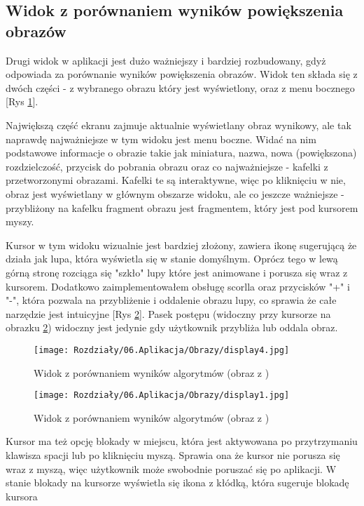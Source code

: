 \subsection*{Widok z porównaniem wyników powiększenia obrazów}

Drugi widok w aplikacji jest dużo ważniejszy i bardziej rozbudowany, gdyż odpowiada za porównanie wyników powiększenia obrazów. Widok ten składa się z dwóch części - z wybranego obrazu który jest wyświetlony, oraz z menu bocznego [Rys \ref{fig:image93}].

Największą część ekranu zajmuje aktualnie wyświetlany obraz wynikowy, ale tak naprawdę najważniejsze w tym widoku jest menu boczne. Widać na nim podstawowe informacje o obrazie takie jak miniatura, nazwa, nowa (powiększona) rozdzielczość, przycisk do pobrania obrazu oraz co najważniejsze - kafelki z przetworzonymi obrazami. Kafelki te są interaktywne, więc po kliknięciu w nie, obraz jest wyświetlany w głównym obszarze widoku, ale co jeszcze ważniejsze - przybliżony na kafelku fragment obrazu jest fragmentem, który jest pod kursorem myszy. 

Kursor w tym widoku wizualnie jest bardziej złożony, zawiera ikonę sugerującą że działa jak lupa, która wyświetla się w stanie domyślnym. Oprócz tego w lewą górną stronę rozciąga się "szkło" lupy które jest animowane i porusza się wraz z kursorem. 
Dodatkowo zaimplementowałem obsługę scorlla oraz przycisków "+" i "-", która pozwala na przybliżenie i oddalenie obrazu lupy, co sprawia że całe narzędzie jest intuicyjne [Rys \ref{fig:image94}]. Pasek postępu (widoczny przy kursorze na obrazku \ref{fig:image94}) widoczny jest jedynie gdy użytkownik przybliża lub oddala obraz. 

\begin{figure}[H]
    \centering
    \texttt{[image: Rozdziały/06.Aplikacja/Obrazy/display4.jpg]}  
    \caption{Widok z porównaniem wyników algorytmów (obraz z \cite{guo2017deep})}
    \label{fig:image93}
\end{figure}

\begin{figure}[H]
    \centering
    \texttt{[image: Rozdziały/06.Aplikacja/Obrazy/display1.jpg]}  
    \caption{Widok z porównaniem wyników algorytmów (obraz z \cite{guo2017deep})}
    \label{fig:image94}
\end{figure}

\newpage
Kursor ma też opcję blokady w miejscu, która jest aktywowana po przytrzymaniu klawisza spacji lub po kliknięciu myszą. Sprawia ona że kursor nie porusza się wraz z myszą, więc użytkownik może swobodnie poruszać się po aplikacji. W stanie blokady na kursorze wyświetla się ikona z kłódką, która sugeruje blokadę kursora

